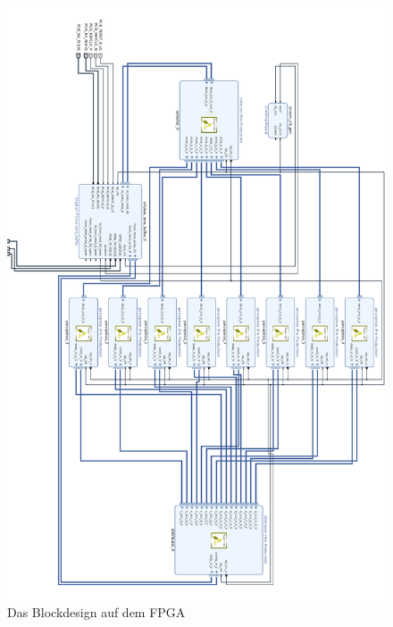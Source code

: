  \begin{figure}[ht]
\centering
\includegraphics[scale=0.7]{bilder/blockdesign}
\caption{Das Blockdesign auf dem FPGA}
\end{figure}
